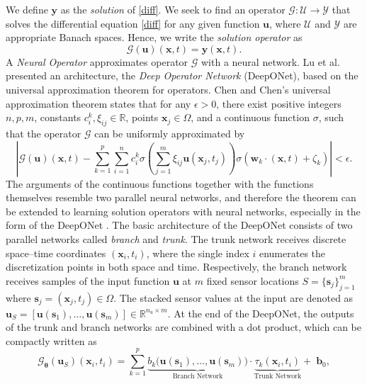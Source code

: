\documentclass[final,1p,times]{elsarticle}
\theoremstyle{plain} %
\theoremstyle{definition} %
\theoremstyle{remark} %
\begin{document}
We define $\mathbf{y}$ as the \textit{solution} of \eqref{diff}. We seek to find an operator $\mathcal{G}: \mathcal{U}\to \mathcal{Y}$ that solves the differential equation \eqref{diff} for any given function $\mathbf{u}$, where $\mathcal{U}$ and $\mathcal{Y}$ are appropriate Banach spaces. Hence, we write the \textit{solution operator} as
%
\begin{equation}\label{solution_operator}
\mathcal{G}(\mathbf{u})(\mathbf{x},t)=\mathbf{y}(\mathbf{x},t).
\end{equation}
%
A \textit{Neural Operator} approximates operator $\mathcal{G}$ with a neural network. Lu et al. \cite{lu2021learning} presented an architecture, the \textit{Deep Operator Network} (DeepONet), based on the universal approximation theorem for operators. Chen and Chen's \cite{chen1995universal} universal approximation theorem states that for any $\epsilon > 0$, there exist positive integers $n, p, m$, constants $c_i^k, \xi_{ij} \in \mathbb{R}$, points $\mathbf{x}_j \in \Omega$, and a continuous function $\sigma$, such that the operator $\mathcal{G}$ can be uniformly approximated by
\begin{equation}\label{deeponet_theorem}
    \left| \mathcal{G}(\mathbf{u})(\mathbf{x},t) - \sum_{k=1}^{p} \sum_{i=1}^{n} c_i^k \sigma\left( \sum_{j=1}^{m} \xi_{ij} \mathbf{u}(\mathbf{x}_j,t_j) \right) \sigma(\mathbf{w}_k \cdot (\mathbf{x}, t) + \zeta_k) \right| < \epsilon.
\end{equation}
The arguments of the continuous functions together with the functions themselves resemble two parallel neural networks, and therefore the theorem can be extended to learning solution operators with neural networks, especially in the form of the DeepONet \cite{lu2021learning}. The basic architecture of the DeepONet consists of two parallel networks called \textit{branch} and \textit{trunk}. The trunk network receives discrete space–time coordinates $(\mathbf{x}_i,t_i)$, where the single index $i$ enumerates the discretization points in both space and time. Respectively,  the branch network receives samples of the input function $\mathbf{u}$ at $m$ fixed sensor locations $S=\{\mathbf{s}_j\}_{j=1}^{m}$ where $\mathbf{s}_j=(\mathbf{x}_j,t_j)\in\Omega$. The stacked sensor values at the input are denoted as $\mathbf{u}_S=[\mathbf{u}(\mathbf{s}_1),\dots,\mathbf{u}(\mathbf{s}_m)]\in\mathbb{R}^{n_u\times m}$. At the end of the DeepONet, the outputs of the trunk and branch networks are combined with a dot product, which can be compactly written as
\begin{equation}\label{deeponet_approx}
    \mathcal{G}_{\bm{\theta}}(\mathbf{u}_S)(\mathbf{x}_i,t_i) = \sum_{k=1}^{p} \underbrace{b_k\big(\mathbf{u}(\mathbf{s}_1), \dots, \mathbf{u}(\mathbf{s}_{m})\big)}_{\text{Branch Network}} \cdot \underbrace{\tau_k(\mathbf{x}_i,t_i)}_{\text{Trunk Network}} +\; \mathbf{b}_0,
\end{equation}
\end{document}
